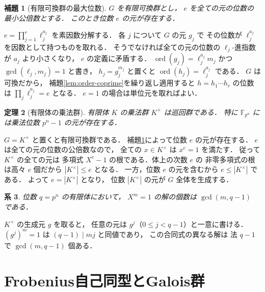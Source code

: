 \documentclass[a5paper,10pt,onecolumn]{jsarticle}
\makeatletter
\theoremstyle{mathnotetheorem}
\newtheorem{theorem}{定理}[section]
\newtheorem{lemma}[theorem]{補題}
\newtheorem{corollary}[theorem]{系}
\renewcommand{\proofname}{証明}
\renewenvironment{proof}[1][\proofname]{%
  \par\pushQED{\qed}\normalfont\topsep4\p@\@plus2\p@\relax
  \trivlist\item[\hskip\labelsep\bfseries #1]\ignorespaces
}{\popQED\endtrivlist\@endpefalse}
\makeatother
\begin{document}
\begin{lemma}[有限可換群の最大位数]\label{lem:exponent}
$G$ を有限可換群とし，
$e$ を全ての元の位数の最小公倍数とする．
このとき位数 $e$ の元が存在する．
\end{lemma}
\begin{proof}
$e=\prod_{j=1}^r\ell_j^{a_j}$ を素因数分解する．
各 $j$ について $G$ の元 $g_j$ で
その位数が $\ell_j^{a_j}$ を因数として持つものを取れる．
そうでなければ全ての元の位数の
$\ell_j$-進指数が $a_j$ より小さくなり，
$e$ の定義に矛盾する．
$\operatorname{ord}(g_j)=\ell_j^{a_j}m_j$
かつ $\gcd(\ell_j,m_j)=1$ と書き，
$h_j=g_j^{m_j}$ と置くと
$\operatorname{ord}(h_j)=\ell_j^{a_j}$ である．
$G$ は可換だから，
補題\ref{lem:order-coprime}を繰り返し適用すると
$h=h_1\cdots h_r$ の位数は
$\prod_j\ell_j^{a_j}=e$ となる．
$e=1$ の場合は単位元を取ればよい．
\end{proof}

\begin{theorem}[有限体の乗法群]\label{thm:cyclic}
有限体 $K$ の乗法群 $K^\times$ は巡回群である．
特に $\mathbb F_{p^n}$ には乗法位数 $p^n-1$ の元が存在する．
\end{theorem}
\begin{proof}
$G=K^\times$ と置くと有限可換群である．
補題\ref{lem:exponent}によって位数 $e$ の元が存在する．
$e$ は全ての元の位数の公倍数なので，
全ての $x\in K^\times$ は $x^e=1$ を満たす．
従って $K^\times$ の全ての元は
多項式 $X^e-1$ の根である．体上の次数 $e$ の
非零多項式の根は高々 $e$ 個だから
$|K^\times|\le e$ となる．
一方，位数 $e$ の元を含むから $e\le|K^\times|$ である．
よって $e=|K^\times|$ となり，
位数 $|K^\times|$ の元が $G$ 全体を生成する．
\end{proof}

\begin{corollary}
位数 $q=p^n$ の有限体において，
$X^m=1$ の解の個数は
$\gcd(m,q-1)$ である．
\end{corollary}
\begin{proof}
$K^\times$ の生成元 $g$ を取ると，
任意の元は $g^j$（$0\le j<q-1$）と一意に書ける．
$(g^j)^m=1$ は
$(q-1)\mid mj$ と同値であり，
この合同式の異なる解は
法 $q-1$ で $\gcd(m,q-1)$ 個ある．
\end{proof}

\section{Frobenius自己同型とGalois群}
\end{document}
